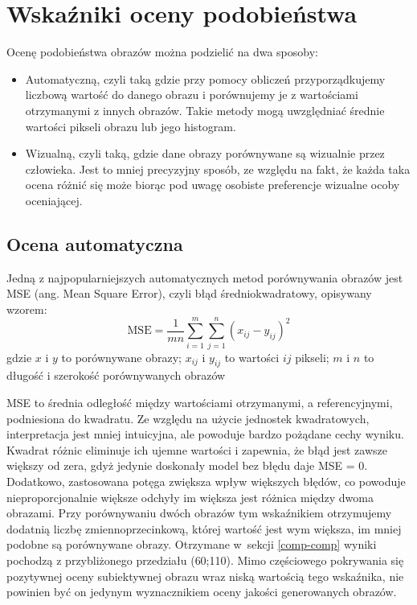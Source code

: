     \section{Wskaźniki oceny podobieństwa} \label{comp-methods}
    Ocenę podobieństwa obrazów można podzielić na dwa sposoby:
    \begin{itemize}
        \item Automatyczną, czyli taką gdzie przy pomocy obliczeń przyporządkujemy liczbową wartość do danego obrazu i porównujemy je z wartościami otrzymanymi z innych obrazów. Takie metody mogą uwzględniać średnie wartości pikseli obrazu lub jego histogram.
        \item Wizualną, czyli taką, gdzie dane obrazy porównywane są wizualnie przez człowieka. Jest to mniej precyzyjny sposób, ze względu na fakt, że każda taka ocena różnić się może biorąc pod uwagę osobiste preferencje wizualne ocoby oceniającej.
    \end{itemize}
    \newpage
    
        \subsection{Ocena automatyczna}
        Jedną z najpopularniejszych automatycznych metod porównywania obrazów jest MSE (ang. Mean Square Error), czyli błąd średniokwadratowy, opisywany wzorem:
        \begin{equation} \label{comp-methods-mse}
            \mathrm{MSE} = \frac{1}{mn} \sum_{i=1}^m \sum_{j=1}^n (x_{ij}-y_{ij})^2
        \end{equation}
        gdzie \(x\) i \(y\) to porównywane obrazy; \(x_{ij}\) i \(y_{ij}\) to wartości \(ij\) pikseli; \(m\) i \(n\) to długość i szerokość porównywanych obrazów
        
        MSE to średnia odległość między wartościami otrzymanymi, a referencyjnymi, podniesiona do kwadratu. Ze względu na użycie jednostek kwadratowych, interpretacja jest mniej intuicyjna, ale powoduje bardzo pożądane cechy wyniku. Kwadrat różnic eliminuje ich ujemne wartości i zapewnia, że błąd jest zawsze większy od zera, gdyż jedynie doskonały model bez błędu daje MSE = 0. Dodatkowo, zastosowana potęga zwiększa wpływ większych błędów, co powoduje nieproporcjonalnie większe odchyły im większa jest różnica między dwoma obrazami. Przy porównywaniu dwóch obrazów tym wskaźnikiem otrzymujemy dodatnią liczbę zmiennoprzecinkową, której wartość jest wym większa, im mniej podobne są porównywane obrazy. Otrzymane w~sekcji \ref{comp-comp} wyniki pochodzą z przybliżonego przedziału (60;110). Mimo częściowego pokrywania się pozytywnej oceny subiektywnej obrazu wraz niską wartością tego wskaźnika, nie powinien być on jedynym wyznacznikiem oceny jakości generowanych obrazów.
        
